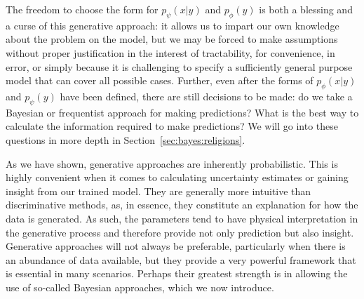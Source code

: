 The freedom to choose the form for $p_{\psi}(x | y)$ and $p_{\phi}(y)$
is both a blessing and a curse of this generative approach: it allows us to impart our own knowledge about the problem on
the model, but we may be forced to make assumptions without proper justification in the interest
of tractability, for convenience, in error, or simply because it is challenging to specify a sufficiently
general purpose model that can cover all possible cases.
Further, even after the forms of $p_{\phi}(x |y)$ and $p_{\psi}(y)$ have been defined, there are still decisions to be
made: do we take a Bayesian or frequentist approach for making predictions? What is the best way
to calculate the information required to make predictions?  We will go into these questions in
more depth in Section~\ref{sec:bayes:religions}.

As we have shown, generative approaches are inherently probabilistic.  This is highly convenient
when it comes to calculating uncertainty estimates or gaining insight from our trained model.
They are generally more intuitive than discriminative methods, as, in essence, they constitute an explanation for how the data is
generated.  As such, the parameters tend to have physical interpretation in the generative process and
therefore provide not only prediction but also insight.  Generative approaches will not always be preferable,
particularly when there is an abundance of data available, but they provide a very powerful framework
that is essential in many scenarios.  Perhaps their greatest strength is in allowing the use of so-called
Bayesian approaches, which we now introduce.